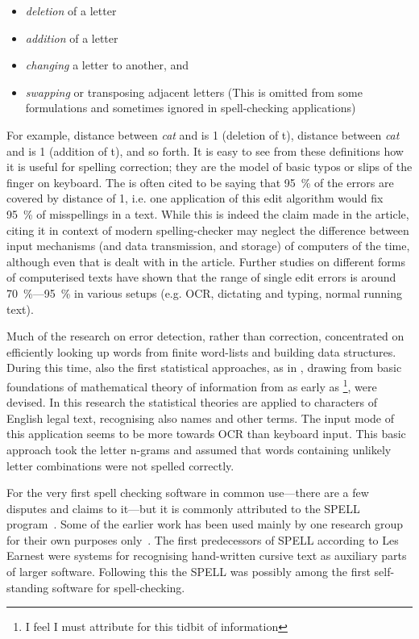 \documentclass[officiallayout,draft]{unihelcompling}
\newcommand\misspelt{\bgroup\markoverwith
{\textcolor{red}{\lower3.5pt\hbox{\sixly \char58}}}\ULon}
\begin{document}
\begin{itemize}
    \item \emph{deletion} of a letter
    \item \emph{addition} of a letter
    \item \emph{changing} a letter to another, and
    \item \emph{swapping} or transposing adjacent letters
        (This is omitted from some formulations and sometimes ignored in
        spell-checking applications)
\end{itemize}

For example, distance between \emph{cat} and \misspelt{ca} is 1 (deletion of
t), distance between \emph{cat} and \misspelt{catt} is 1 (addition of t), and
so forth.  It is easy to see from these definitions how it is useful for
spelling correction; they are the model of basic typos or slips of the finger
on keyboard. The \citep{damerau1964technique} is often cited to be saying that
95~\% of the errors are covered by distance of 1, i.e. one application of this
edit algorithm would fix 95~\% of misspellings in a text. While this is indeed
the claim made in the article, citing it in context of modern spelling-checker
may neglect the difference between input mechanisms (and data transmission, and
storage) of computers of the time, although even that is dealt with in the
article. Further studies on different forms of computerised texts have shown
that the range of single edit errors is around 70~\%---95~\% in various setups
(e.g. OCR, dictating and typing, normal running text).

Much of the research on error detection, rather than correction, concentrated
on efficiently looking up words from finite word-lists and building data
structures. During this time, also the first statistical approaches, as in
\citet{raviv1967decision}, drawing from basic foundations of mathematical
theory of information from as early as
\citet{shannon1948mathematical}\footnote{I feel I must attribute
\citet{liberman2012noisily} for this tidbit of information}, were devised. In
this research the statistical theories are applied to characters of English
legal text, recognising also names and other terms. The input mode of this
application seems to be more towards OCR than keyboard input. This basic
approach took the letter n-grams and assumed that words containing unlikely
letter combinations were not spelled correctly.

For the very first spell checking software in common use---there are a few
disputes and claims to it---but it is commonly attributed to the SPELL
program~\citep{gorin1971spell}.  Some of the earlier work has been used mainly
by one research group for their own purposes 
only~\citep{earnest2011first,earnest2012first}. The first predecessors of SPELL
according to Les Earnest were systems for recognising hand-written cursive text
as auxiliary parts of larger software. Following this the SPELL was possibly
among the first self-standing software for spell-checking.
\end{document}
